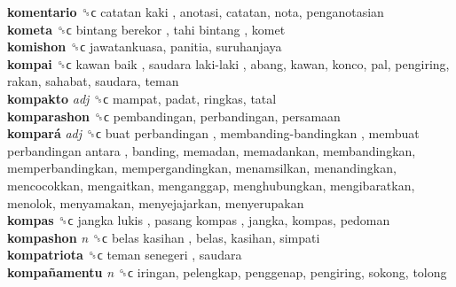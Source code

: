 \textbf{komentario} ␝ϲ   catatan kaki , anotasi, catatan, nota, penganotasian  \\
\textbf{kometa} ␝ϲ   bintang berekor ,  tahi bintang , komet  \\
\textbf{komishon} ␝ϲ  jawatankuasa, panitia, suruhanjaya  \\
\textbf{kompai} ␝ϲ   kawan baik ,  saudara laki-laki , abang, kawan, konco, pal, pengiring, rakan, sahabat, saudara, teman  \\
\textbf{kompakto} \emph{adj}  ␝ϲ  mampat, padat, ringkas, tatal  \\
\textbf{komparashon} ␝ϲ  pembandingan, perbandingan, persamaan  \\
\textbf{kompará} \emph{adj}  ␝ϲ   buat perbandingan ,  membanding-bandingkan ,  membuat perbandingan antara , banding, memadan, memadankan, membandingkan, memperbandingkan, mempergandingkan, menamsilkan, menandingkan, mencocokkan, mengaitkan, menganggap, menghubungkan, mengibaratkan, menolok, menyamakan, menyejajarkan, menyerupakan  \\
\textbf{kompas} ␝ϲ   jangka lukis ,  pasang kompas , jangka, kompas, pedoman  \\
\textbf{kompashon} \emph{n}  ␝ϲ   belas kasihan , belas, kasihan, simpati  \\
\textbf{kompatriota} ␝ϲ   teman senegeri , saudara  \\
\textbf{kompañamentu} \emph{n}  ␝ϲ  iringan, pelengkap, penggenap, pengiring, sokong, tolong  \\
